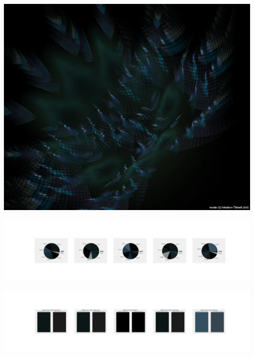 \documentclass[11pt]{article}
\begin{document}
\begin{landscape}
    \begin{center}
    \includegraphics[width=\textwidth]{./nbimg/file (10).jpg}
    \end{center}

    \begin{center}
    \includegraphics[width=250mm]{./nbimg/pie-1.jpg}
    \end{center}

    \begin{center}
    \includegraphics[width=250mm]{./nbimg/peak-1.jpg}
    \end{center}
    


\end{landscape}
\end{document}
